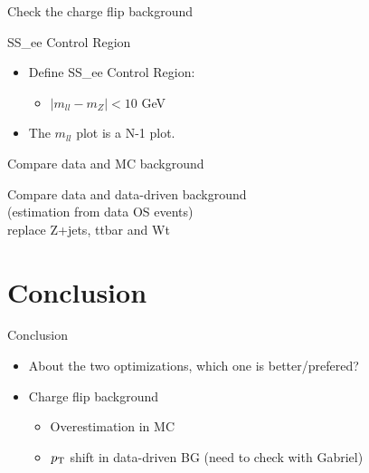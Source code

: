\documentclass[mathserif,serif]{beamer}
\begin{document}
\begin{frame}
\begin{center}
\huge
Check the charge flip background
\end{center}
\end{frame}

\begin{frame}{SS\_ee Control Region}
\begin{itemize}
\item Define SS\_ee Control Region:
\begin{itemize}
\item $|m_{ll}-m_Z| < 10$ GeV
\end{itemize}
\item The $m_{ll}$ plot is a N-1 plot.
\end{itemize}
\end{frame}

\begin{frame}
\begin{center}
\huge
Compare data and MC background
\end{center}
\end{frame}




\begin{frame}
\begin{center}
\huge
Compare data and data-driven background \\
\normalsize
(estimation from data OS events) \\
replace Z+jets, ttbar and Wt
\end{center}
\end{frame}




\section{Conclusion}
\begin{frame}{Conclusion}
\begin{itemize}
\item About the two optimizations, which one is better/prefered?
\item Charge flip background
\begin{itemize}
\item Overestimation in MC
\item $p_{\text{T}}$ shift in data-driven BG (need to check with Gabriel)
\end{itemize}
\end{itemize}
\end{frame}
\end{document}

